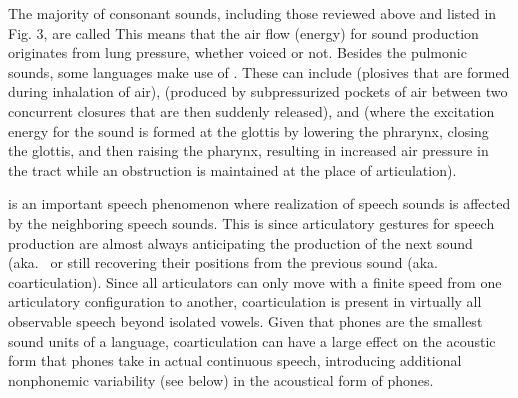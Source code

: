 \documentclass[letterpaper,10pt,english]{jupyterBook}
\begin{document}
\sphinxAtStartPar
{}

\sphinxAtStartPar
The majority of consonant sounds, including those reviewed above and
listed in Fig. 3, are called  This means that the
air flow (energy) for sound production originates from lung pressure,
whether voiced or not. Besides the pulmonic sounds, some languages make
use of . These can include 
(plosives that are formed during inhalation of air),  (produced
by subpressurized pockets of air between two concurrent closures that
are then suddenly released), and  (where the excitation
energy for the sound is formed at the glottis by lowering the phrarynx,
closing the glottis, and then raising the pharynx, resulting in
increased air pressure in the tract while an obstruction is maintained
at the place of articulation).

\sphinxAtStartPar
{} is an
important speech phenomenon where realization of speech sounds is
affected by the neighboring speech sounds. This is since articulatory
gestures for speech production are almost always anticipating the
production of the next sound (aka.  or
still recovering their positions from the previous sound (aka.
 coarticulation). Since all articulators can only move
with a finite speed from one articulatory configuration to another,
coarticulation is present in virtually all observable speech beyond
isolated vowels. Given that phones are the smallest sound units of a
language, coarticulation can have a large effect on the acoustic form
that phones take in actual continuous speech, introducing additional
non\sphinxhyphen{}phonemic variability (see below) in the acoustical form of phones.
\end{document}
